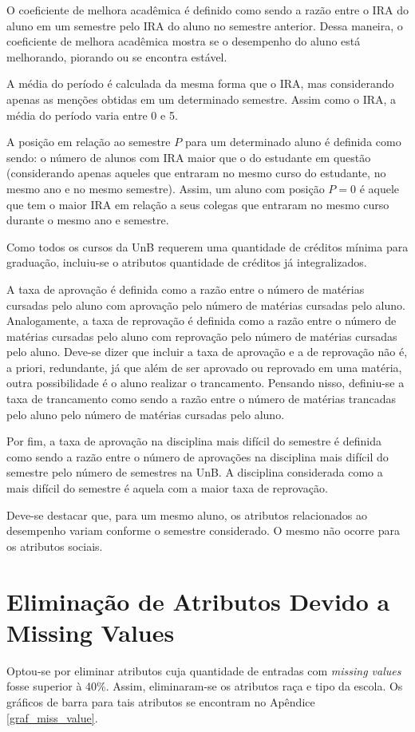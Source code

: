 \par O coeficiente de melhora acadêmica é definido como sendo a razão entre o IRA do
aluno em um semestre pelo IRA do aluno no semestre anterior. Dessa maneira, o
coeficiente de melhora acadêmica mostra se o desempenho do aluno está
melhorando, piorando ou se encontra estável.  
\par A média do período é calculada da mesma forma que o IRA, mas considerando apenas
as menções obtidas em um determinado semestre. Assim como o IRA, a média do período
varia entre 0 e 5.
\par A posição em relação ao semestre $P$ para um determinado aluno é definida como sendo:
o número de alunos com IRA maior que o do estudante em questão
(considerando apenas aqueles que entraram no mesmo curso do estudante, no mesmo ano e
no mesmo semestre). Assim, um aluno com posição $P = 0$ é aquele que tem o maior
IRA em relação a seus colegas que entraram no mesmo curso durante o mesmo ano e
semestre.  
\par Como todos os cursos da UnB requerem uma quantidade de créditos mínima para
graduação, incluiu-se o atributos quantidade de créditos já integralizados. 
\par A taxa de aprovação é definida como a razão entre o número de matérias cursadas
pelo aluno com aprovação pelo número de matérias cursadas pelo aluno. Analogamente, a
taxa de reprovação é definida como a razão entre o número de matérias cursadas pelo
aluno com reprovação pelo número de matérias cursadas pelo aluno. Deve-se dizer que 
incluir a taxa de aprovação e a de reprovação não é, a priori, redundante, já que
além de ser aprovado ou reprovado em uma matéria, outra possibilidade é o aluno
realizar o trancamento.  Pensando nisso, definiu-se a taxa de trancamento como sendo
a razão entre o número de matérias trancadas pelo aluno pelo número de matérias
cursadas pelo aluno.
\par Por fim, a taxa de aprovação na disciplina mais difícil do semestre é definida
como sendo a razão entre o número de aprovações na disciplina mais difícil do
semestre pelo número de semestres na UnB. A disciplina considerada como a mais
difícil do semestre é aquela com a maior taxa de reprovação. 
\par Deve-se destacar que, para um mesmo aluno, os atributos relacionados ao
desempenho variam conforme o semestre considerado. O mesmo não ocorre para os
atributos sociais. 

\section{Eliminação de Atributos Devido a Missing Values}
Optou-se por eliminar atributos cuja quantidade de entradas com \textit{missing
values} fosse superior à 40\%. Assim, eliminaram-se os atributos raça e tipo da
escola. Os gráficos de barra para tais atributos se encontram no Apêndice
\ref{graf_miss_value}.

